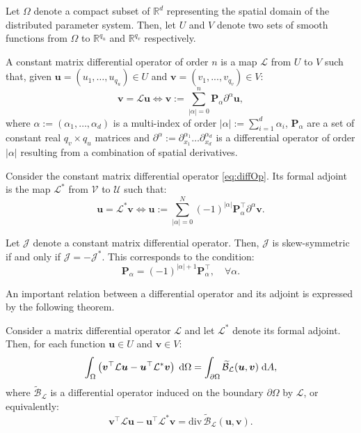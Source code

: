 Let $\Omega$ denote a compact subset of $\mathbb{R}^d$ representing the spatial domain of the distributed parameter system. Then, let ${U}$ and ${V}$ denote two sets of smooth functions from $\Omega$ to $\mathbb{R}^{q_u}$ and $\mathbb{R}^{q_v}$ respectively.
\begin{definition}
	A constant matrix differential operator of order $n$ is a map $\mathcal{L}$ from ${U}$ to ${V}$ such that, given $\bm{u} = (u_1 , \dots , u_{q_u}) \in {U}$ and $\bm{v} = (v_1 , . . . , v_{q_v}) \in {V}$:
	\begin{equation}
	\label{eq:diffOp}
	\bm{v} = \mathcal{L} \bm{u} \iff \bm{v} := \sum_{|\alpha|=0}^n  \bm{P}_{\alpha} \partial^{\alpha} \bm{u},
	\end{equation}
	where $\alpha := (\alpha_1, \dots , \alpha_d)$ is a multi-index of order $|\alpha| := \sum_{i=1}^d \alpha_i$, $\bm{P}_\alpha$ are a set of constant real $q_v \times q_u$ matrices and $\partial^{\alpha} := \partial_{x_1}^{\alpha_1} \dots \partial_{x_d}^{\alpha_d}$ is a differential operator of order $|\alpha|$ resulting from a combination of spatial derivatives. 
\end{definition}
\begin{definition}
	Consider the constant matrix differential operator \eqref{eq:diffOp}. Its formal adjoint is the map $\mathcal{L}^*$ from $\mathcal{V}$ to $\mathcal{U}$ such that:
	\begin{equation}
	\bm{u} = \mathcal{L}^* \bm{v} \iff \bm{u} := \sum_{|\alpha|=0}^N  (-1)^{|\alpha|} \bm{P}_{\alpha}^\top \partial^{\alpha} \bm{v}.
	\end{equation}
\end{definition}
\begin{definition}
	\label{def:skewOp}
	Let $\mathcal{J}$ denote a constant matrix differential operator. Then, $\mathcal{J}$ is skew-symmetric if and only if $\mathcal{J} = -\mathcal{J}^*$. This corresponds to the condition:
	\begin{equation}
	\bm{P}_{\alpha} = (-1)^{|\alpha| + 1} \bm{P}_{\alpha}^\top, \quad \forall \alpha.
	\end{equation}
\end{definition}
An important relation between a differential operator and
its adjoint is expressed by the following theorem.
\begin{theorem}
	Consider a matrix differential operator $\mathcal{L}$ and let $\mathcal{L}^*$ denote its formal adjoint. Then, for each function $\bm{u} \in {U}$ and $\bm{v} \in {V}$:
	\begin{equation}
	\int_{\Omega} \left( \bm{v}^\top \mathcal{L} \bm{u} - \bm{u}^\top \mathcal{L}^* \bm{v}\right) \d\Omega= \int_{\partial \Omega} \widetilde{\mathcal{B}}_{\mathcal{L}}(\bm{u}, \bm{v}) \d{A},
	\end{equation}
	where $\widetilde{\mathcal{B}}_{\mathcal{L}}$ is a differential operator induced on the boundary $\partial\Omega$ by $\mathcal{L}$, or equivalently:
	\begin{equation}
	\bm{v}^\top \mathcal{L} \bm{u} - \bm{u}^\top \mathcal{L}^* \bm{v} = \mathrm{div} \, \widetilde{\mathcal{B}}_{\mathcal{L}}(\bm{u}, \bm{v}).
	\end{equation}
\end{theorem}
